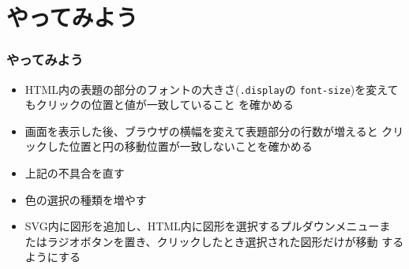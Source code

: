  \section{やってみよう}
\begin{frame}[containsverbatim]
  \frametitle{やってみよう}
 \begin{itemize}
  \item HTML内の表題の部分のフォントの大きさ(\texttt{.display}の
        \texttt{font-size})を変えてもクリックの位置と値が一致していること
        を確かめる
  \item 画面を表示した後、ブラウザの横幅を変えて表題部分の行数が増えると
        クリックした位置と円の移動位置が一致しないことを確かめる
  \item 上記の不具合を直す
  \item 色の選択の種類を増やす
  \item SVG内に図形を追加し、HTML内に図形を選択するプルダウンメニューま
        たはラジオボタンを置き、クリックしたとき選択された図形だけが移動
        するようにする
 \end{itemize}
\end{frame}

\begin{frame}[containsverbatim]
 \frametitle{}
\end{frame}
